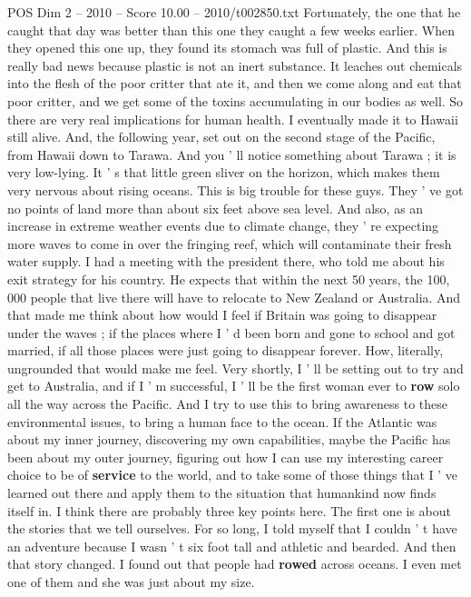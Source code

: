 \begin{textsample}{POS Dim 2 – 2010 – Score 10.00 – 2010/t002850.txt}
Fortunately, the one that he caught that day was better than this one they caught a few weeks earlier.
When they opened this one up, they found its stomach was full of plastic.
And this is really bad news because plastic is not an inert substance.
It leaches out chemicals into the flesh of the poor critter that ate it, and then we come along and eat that poor critter, and we get some of the toxins accumulating in our bodies as well.
So there are very real implications for human health.
I eventually made it to Hawaii still alive.
And, the following year, set out on the second stage of the Pacific, from Hawaii down to Tarawa.
And you ' ll notice something about Tarawa ; it is very low-lying.
It ' s that little green sliver on the horizon, which makes them very nervous about rising oceans.
This is big trouble for these guys.
They ' ve got no points of land more than about six feet above sea level.
And also, as an increase in extreme weather events due to climate change, they ' re expecting more waves to come in over the fringing reef, which will contaminate their fresh water supply.
I had a meeting with the president there, who told me about his exit strategy for his country.
He expects that within the next 50 years, the 100, 000 people that live there will have to relocate to New Zealand or Australia.
And that made me think about how would I feel if Britain was going to disappear under the waves ; if the places where I ' d been born and gone to school and got married, if all those places were just going to disappear forever.
How, literally, ungrounded that would make me feel.
Very shortly, I ' ll be setting out to try and get to Australia, and if I ' m successful, I ' ll be the first woman ever to \textbf{row} solo all the way across the Pacific.
And I try to use this to bring awareness to these environmental issues, to bring a human face to the ocean.
If the Atlantic was about my inner journey, discovering my own capabilities, maybe the Pacific has been about my outer journey, figuring out how I can use my interesting career choice to be of \textbf{service} to the world, and to take some of those things that I ' ve learned out there and apply them to the situation that humankind now finds itself in.
I think there are probably three key points here.
The first one is about the stories that we tell ourselves.
For so long, I told myself that I couldn ' t have an adventure because I wasn ' t six foot tall and athletic and bearded.
And then that story changed.
I found out that people had \textbf{rowed} across oceans.
I even met one of them and she was just about my size.

\end{textsample}

